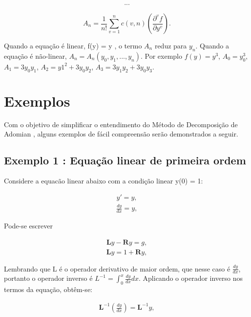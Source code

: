  \begin{gather*}
 ...
 \end{gather*}
 
 \begin{equation}
  A_{n} = \dfrac{1}{n!} \sum_{v=1}^{n} c(v,n)\left(\dfrac{\partial^vf }{\partial y^v}\right).
 \end{equation}
  
  Quando a equação é linear, f(y) = y , o termo $A_{n}$ reduz para $y_{n}$. Quando a equação é não-linear, $A_{n} = A_{n} (y_{0}, y_{1},...,y_{n})$. Por exemplo $f(y) = y^3$, $A_{0} = y_{0}^3$, $A_{1} = 3y_{0}y_{1}$, $A_{2} = y1^2+3y_{0}y_{2}$, $A_{3} = 3y_{1}y_{2} + 3y_{0}y_{3}$.

 
 
 \section{Exemplos}
 
 Com o objetivo de simplificar o entendimento do Método de Decomposição de Adomian , alguns exemplos de fácil compreensão serão demonstrados a seguir.
 
 \subsection{Exemplo 1 : Equação linear de primeira ordem}
 
 Considere a equacão linear abaixo com a condição linear y(0) = 1:
 
 \begin{gather*}
 y' = y, 
  \end{gather*}
   \begin{gather*}
 \frac{d y}{d x} = y,
 \end{gather*}

Pode-se escrever

\begin{gather*}
 \textbf{L}y - \textbf{R}y = g,
  \end{gather*}
  \begin{gather*}
 \textbf{L}y = 1 + \textbf{R}y ,
  \end{gather*}
  
  Lembrando que L é o operador derivativo de maior ordem, que nesse caso é $\frac{d y}{d x}$, portanto o operador inverso é $L^{-1}=\int_0^{x}\frac{d y}{d x} dx$. Aplicando o operador inverso nos termos da equação, obtêm-se:

\begin{gather*}
 \textbf{L}^{-1}\left(\frac{d y}{d x}\right) = \textbf{L}^{-1} y,
  \end{gather*}
  
